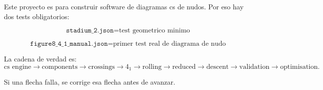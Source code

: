 \documentclass[11pt,letterpaper]{amsart}
\begin{document}
Este proyecto es para construir software de diagramas cs de nudos. Por eso hay
dos tests obligatorios:

\[
\boxed{
\texttt{stadium\_2.json}
=
\text{test geometrico minimo}
}
\]

\[
\boxed{
\texttt{figure8\_4\_1\_manual.json}
=
\text{primer test real de diagrama de nudo}
}
\]

La cadena de verdad es:
\[
\boxed{
\text{cs engine}
\to
\text{components}
\to
\text{crossings}
\to
4_1
\to
\text{rolling}
\to
\text{reduced}
\to
\text{descent}
\to
\text{validation}
\to
\text{optimisation}.
}
\]

Si una flecha falla, se corrige esa flecha antes de avanzar.
\end{document}
